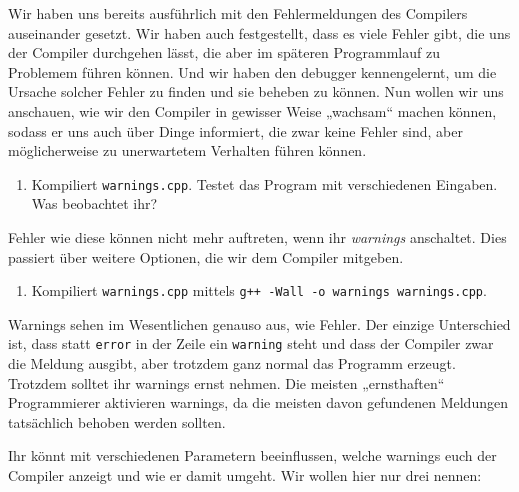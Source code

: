 
Wir haben uns bereits ausführlich mit den Fehlermeldungen des Compilers
auseinander gesetzt. Wir haben auch festgestellt, dass es viele Fehler gibt,
die uns der Compiler durchgehen lässt, die aber im späteren Programmlauf zu
Problemem führen können. Und wir haben den debugger kennengelernt, um die
Ursache solcher Fehler zu finden und sie beheben zu können. Nun wollen wir uns
anschauen, wie wir den Compiler in gewisser Weise „wachsam“ machen können,
sodass er uns auch über Dinge informiert, die zwar keine Fehler sind, aber
möglicherweise zu unerwartetem Verhalten führen können.

\begin{praxis}
    \begin{enumerate}
        \item Kompiliert \texttt{warnings.cpp}. Testet das Program mit
              verschiedenen Eingaben. Was beobachtet ihr?
    \end{enumerate}

    Fehler wie diese können nicht mehr auftreten, wenn ihr \emph{warnings}
    anschaltet. Dies passiert über weitere Optionen, die wir dem Compiler mitgeben.

    \begin{enumerate}[resume]
        \item Kompiliert \texttt{warnings.cpp} mittels \texttt{g++ -Wall -o
                  warnings warnings.cpp}.
    \end{enumerate}

    Warnings sehen im Wesentlichen genauso aus, wie Fehler. Der einzige Unterschied
    ist, dass statt \texttt{error} in der Zeile ein \texttt{warning} steht und dass
    der Compiler zwar die Meldung ausgibt, aber trotzdem ganz normal das Programm
    erzeugt. Trotzdem solltet ihr warnings ernst nehmen. Die meisten „ernsthaften“
    Programmierer aktivieren warnings, da die meisten davon gefundenen Meldungen
    tatsächlich behoben werden sollten.

    Ihr könnt mit verschiedenen Parametern beeinflussen, welche warnings euch der
    Compiler anzeigt und wie er damit umgeht. Wir wollen hier nur drei nennen:


\end{praxis}
